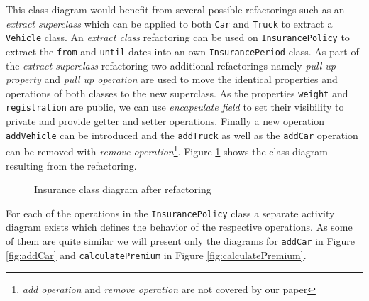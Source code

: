 \documentclass{llncs}
\begin{document}
This class 
diagram would benefit from several possible refactorings such as an \textit{extract superclass} which can be applied to both \texttt{Car} 
and \texttt{Truck} to extract a \texttt{Vehicle} class. An \textit{extract class} refactoring can be used on \texttt{InsurancePolicy} to 
extract the \texttt{from} and \texttt{until} dates into an own \texttt{InsurancePeriod} class. As part of the 
\textit{extract superclass} refactoring two additional refactorings namely \textit{pull up property} and \textit{pull up operation} are 
used to move the identical properties and operations of both classes to the new superclass. As the 
properties \texttt{weight} and \texttt{registration} are public, we can use \textit{encapsulate field} to set their visibility to private and 
provide getter and setter operations. Finally a new operation \texttt{addVehicle} can be introduced and the \texttt{addTruck} as well as 
the \texttt{addCar} operation can be removed with \textit{remove operation}\footnote{\textit{add operation} and \textit{remove operation} are not covered by our paper}. 
Figure \ref{fig:classdiagramcomplexRef} shows the class diagram resulting from the refactoring.

\begin{figure}[h!t]
 \centering
 \caption{Insurance class diagram after refactoring}
 \label{fig:classdiagramcomplexRef}
\end{figure}

For each of the operations in the \texttt{InsurancePolicy} class a separate activity diagram exists which defines the behavior 
of the respective operations. As some of them are quite similar we will present only the diagrams for \texttt{addCar} in Figure 
\ref{fig:addCar} and \texttt{calculatePremium} in  Figure \ref{fig:calculatePremium}.
\end{document}
